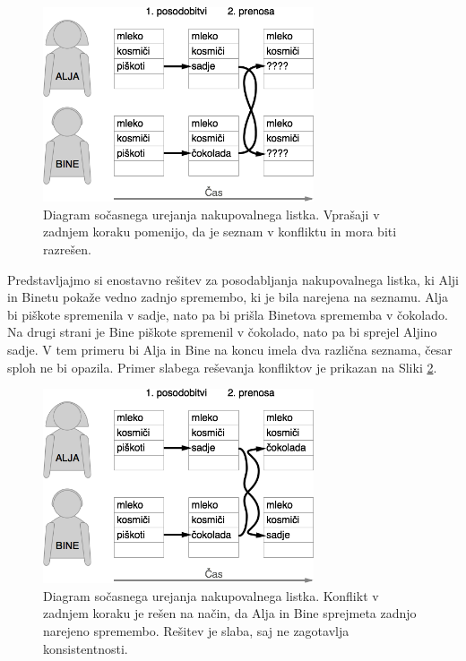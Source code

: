 \documentclass[a4paper, 12pt, twoside]{book}
\begin{document}
\begin{figure}[placement h]
\begin{center}
\includegraphics[width=8cm]{problem2.png}
\end{center}
\caption{Diagram sočasnega urejanja nakupovalnega listka. Vprašaji v zadnjem koraku pomenijo, da je seznam v konfliktu in mora biti razrešen. }
\label{problem2}
\end{figure}

\pagebreak

Predstavljajmo si enostavno rešitev za posodabljanja nakupovalnega listka, ki Alji in Binetu pokaže vedno zadnjo spremembo, ki je bila narejena na seznamu. Alja bi piškote spremenila v sadje, nato pa bi prišla Binetova sprememba v čokolado. Na drugi strani je Bine piškote spremenil v čokolado, nato pa bi sprejel Aljino sadje. V tem primeru bi Alja in Bine na koncu imela dva različna seznama, česar sploh ne bi opazila. Primer slabega reševanja konfliktov je prikazan na Sliki \ref{problem3}.

\begin{figure}[placement h]
\begin{center}
\includegraphics[width=8cm]{problem3.png}
\end{center}
\caption{Diagram sočasnega urejanja nakupovalnega listka. Konflikt v zadnjem koraku je rešen na način, da Alja in Bine sprejmeta zadnjo narejeno spremembo. Rešitev je slaba, saj ne zagotavlja konsistentnosti. }
\label{problem3}
\end{figure}
\end{document}
